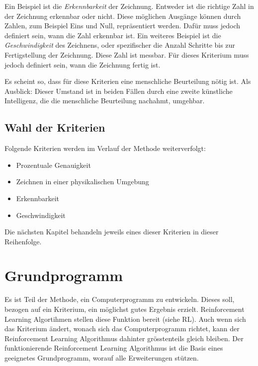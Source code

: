 Ein Beispiel ist die \emph{Erkennbarkeit} der Zeichnung. Entweder ist die
richtige Zahl in der Zeichnung erkennbar oder nicht. Diese möglichen Ausgänge
können durch Zahlen, zum Beispiel Eins und Null, repräsentiert werden. Dafür
muss jedoch definiert sein, wann die Zahl erkennbar ist. 
Ein weiteres Beispiel ist die \emph{Geschwindigkeit} des Zeichnens, oder
spezifischer die Anzahl Schritte bis zur Fertigstellung der Zeichnung. Diese
Zahl ist messbar. Für dieses Kriterium muss jedoch definiert sein, wann die
Zeichnung fertig ist.

Es scheint so, dass für diese Kriterien eine menschliche Beurteilung nötig ist.
Als Ausblick: Dieser Umstand ist in beiden Fällen durch eine zweite
künstliche Intelligenz, die die menschliche Beurteilung nachahmt, umgehbar.

\subsection*{Wahl der Kriterien}
Folgende Kriterien werden im Verlauf der Methode weiterverfolgt:

\begin{itemize}
  \item Prozentuale Genauigkeit
  \item Zeichnen in einer physikalischen Umgebung
  \item Erkennbarkeit 
  \item Geschwindigkeit
\end{itemize}

Die nächsten Kapitel behandeln jeweils eines dieser Kriterien in dieser Reihenfolge.


\section{Grundprogramm}
\label{chap:m_grundprogramm}
Es ist Teil der Methode, ein Computerprogramm zu entwickeln. Dieses soll,
bezogen auf ein Kriterium, ein möglichst gutes Ergebnis erzielt. Reinforcement
Learning Algortihmen stellen diese Funktion bereit (siehe RL). Auch wenn sich  %
das Kriterium ändert, wonach sich das Computerprogramm richtet, kann der
Reinforcement Learning Algorithmus dahinter grösstenteils gleich bleiben. Der
funktionierende Reinforcement Learning Algorithmus ist die Basis eines geeignetes
Grundprogramm, worauf alle Erweiterungen stützen. 

